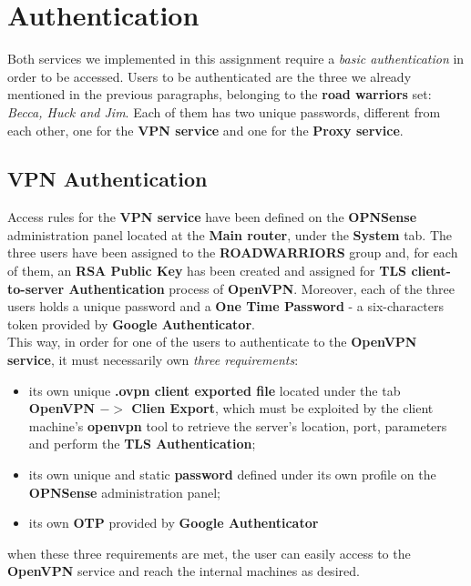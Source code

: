 \section{Authentication}
Both services we implemented in this assignment require a \textit{basic authentication} in order to be accessed. Users to be authenticated are the three we already mentioned in the previous paragraphs, belonging to the \textbf{road warriors} set: \textit{Becca, Huck and Jim}. Each of them has two unique passwords, different from each other, one for the \textbf{VPN service} and one for the \textbf{Proxy service}.\\

\subsection{VPN Authentication}
Access rules for the \textbf{VPN service} have been defined on the \textbf{OPNSense} administration panel located at the \textbf{Main router}, under the \textbf{System} tab. The three users have been assigned to the \textbf{ROADWARRIORS} group and, for each of them, an \textbf{RSA Public Key} has been created and assigned for \textbf{TLS client-to-server Authentication} process of \textbf{OpenVPN}. Moreover, each of the three users holds a unique password and a \textbf{One Time Password} - a six-characters token provided by \textbf{Google Authenticator}.\\
This way, in order for one of the users to authenticate to the \textbf{OpenVPN service}, it must necessarily own \textit{three requirements}:\\
\begin{itemize}
\item its own unique \textbf{.ovpn client exported file} located under the tab \textbf{OpenVPN $->$ Clien Export}, which must be exploited by the client machine's \textbf{openvpn} tool to retrieve the server's location, port, parameters and perform the \textbf{TLS Authentication};
\item its own unique and static \textbf{password} defined under its own profile on the \textbf{OPNSense} administration panel;
\item its own \textbf{OTP} provided by \textbf{Google Authenticator}
\end{itemize}

when these three requirements are met, the user can easily access to the \textbf{OpenVPN} service and reach the internal machines as desired.

